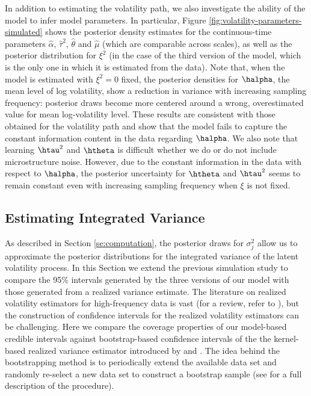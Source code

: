 In addition to estimating the volatility path, we also investigate the ability of the model to infer model parameters.  In particular, Figure \ref{fig:volatility-parameters-simulated} shows the posterior density estimates for the continuous-time parameters $\hat{\alpha}$, $\hat{\tau}^2$, $\hat{\theta}$ and $\hat{\mu}$ (which are comparable across scales), as well as the posterior distribution for $\xi^2$ (in the case of the third version of the model, which is the only one in which it is estimated from the data).  Note that, when the model is estimated with $\xi^2 = 0$ fixed, the posterior densities for $\halpha$, the mean level of log volatility, show a reduction in variance with increasing sampling frequency:  posterior draws become more centered around a wrong, overestimated value for mean log-volatility level. These results are consistent with those obtained for the volatility path and show that the model fails to capture the constant information content in the data regarding $\halpha$.  We also note that learning $\htau^2$ and $\htheta$ is difficult whether we do or do not include microstructure noise. However, due to the constant information in the data with respect to $\halpha$, the posterior uncertainty for $\htheta$ and $\htau^2$ seems to remain constant even with increasing sampling frequency when $\xi$ is not fixed.

\subsection{Estimating Integrated Variance}

As described in Section \ref{se:computation}, the posterior draws for $\sigma^2_{j}$ allow us to approximate the posterior distributions for the integrated variance of the latent volatility process. In this Section we extend the previous simulation study to compare the 95\% intervals generated by the three versions of our model with those generated from a realized variance estimate.  The literature on realized volatility estimators for high-frequency data is vast (for a review, refer to \cite{pigorsch2012volatility}), but the construction of confidence intervals for the realized volatility estimators can be challenging.  Here we compare the coverage properties of our model-based credible intervals against bootstrap-based confidence intervals of the the kernel-based realized variance estimator introduced by \cite{zhou1996high} and \cite{hansen2006realized}. The idea behind the bootstrapping method is to periodically extend the available data set and randomly re-select a new data set to construct a bootstrap sample (see \cite{hwang2013stationary-bootstrap} for a full description of the procedure).

